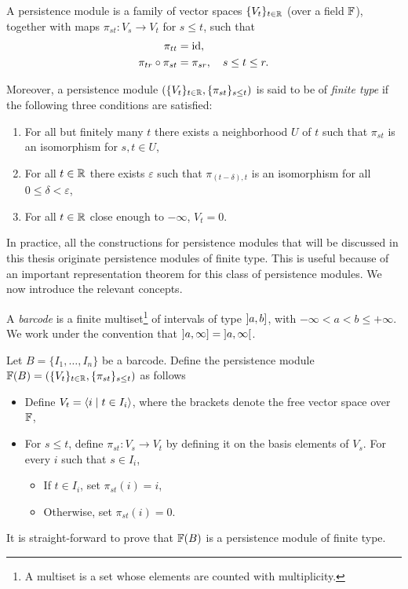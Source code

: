 \begin{definition}
A persistence module is a family of vector spaces $\{V_t\}_{t \in \mathbb{R}}$ (over a field $\mathbb{F}$), together with maps $\pi_{st} \colon V_s \to V_t$ for $s \leq t$, such that
\begin{align}
\pi_{tt} &= \mathrm{id},\\
\pi_{tr} \circ \pi_{st} &= \pi_{sr}, \quad s \leq t \leq r.
\end{align}

Moreover, a persistence module $(\{V_t\}_{t \in \mathbb{R}}, \{\pi_{st}\}_{s\leq t})$ is said to be of \emph{finite type} if the following three conditions are satisfied:
\begin{enumerate}
\item For all but finitely many $t$ there exists a neighborhood $U$ of $t$ such that $\pi_{st}$ is an isomorphism for $s, t \in U$,
\item For all $t \in \mathbb{R}$ there exists $\varepsilon$ such that $\pi_{(t-\delta), t}$ is an isomorphism for all $0 \leq \delta < \varepsilon$,
\item\label{pm3} For all $t \in \mathbb{R}$ close enough to $-\infty$, $V_t = 0$.
\end{enumerate}
\end{definition}

In practice, all the constructions for persistence modules that will be discussed in this thesis originate persistence modules of finite type. This is useful because of an important representation theorem for this class of persistence modules. We now introduce the relevant concepts.

\begin{definition}
A \emph{barcode} is a finite multiset\footnote{A multiset is a set whose elements are counted with multiplicity.} of intervals of type $\linterval a b$, with $-\infty < a < b \leq +\infty$. We work under the convention that $\linterval a \infty = \ointerval a \infty$.
\end{definition}

\begin{definition}
Let $B = \{I_1, \dots, I_n\}$ be a barcode. Define the persistence module $\mathbb{F}(B) = (\{V_t\}_{t \in \mathbb{R}}, \{\pi_{st}\}_{s \leq t})$ as follows
\begin{itemize}
\item Define $V_t = \langle i \mid t \in I_i\rangle$, where the brackets denote the free vector space over $\mathbb{F}$,
\item For $s \leq t$, define $\pi_{st} \colon V_s \to V_t$ by defining it on the basis elements of $V_s$. For every $i$ such that $s \in I_i$,
\begin{itemize}
\item If $t \in I_i$, set $\pi_{st}(i) = i$,
\item Otherwise, set $\pi_{st}(i) = 0$.
\end{itemize}
\end{itemize}

It is straight-forward to prove that $\mathbb{F}(B)$ is a persistence module of finite type.
\end{definition}

